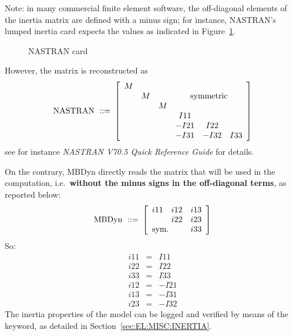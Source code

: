 Note: in many commercial finite element software, the off-diagonal elements 
of the inertia matrix are defined with a minus sign; for instance, 
NASTRAN's  lumped inertia card expects the values as indicated
in Figure~\ref{fig:el:body:CONM2}.
%
\begin{figure}[b]
\centering
\begin{minipage}{120mm}
\end{minipage}
\caption{NASTRAN  card}
\label{fig:el:body:CONM2}
\end{figure}
%
However, the matrix is reconstructed as
\begin{displaymath}
	\mathrm{NASTRAN \ ::= } \ \sqbr{\matr{cccccc}{
		M & & & & & \\
		& M & & \multicolumn{3}{c}{\mathrm{symmetric}} \\
		& & M & & & \\
		& & & I11 & & \\
		& & & -I21 & I22 & \\
		& & & -I31 & -I32 & I33
	}}
\end{displaymath}
see for instance \emph{NASTRAN V70.5 Quick Reference Guide} for details.

\noindent
On the contrary, MBDyn directly reads the matrix 
that will be used in the computation, i.e.\ 
\textbf{without the minus signs in the off-diagonal terms},
as reported below:
\begin{displaymath}
	\mathrm{MBDyn \ ::= } \ \sqbr{\matr{ccc}{
		i11 & i12 & i13 \\
		& i22 & i23 \\
		\multicolumn{2}{l}{\mathrm{sym.}} & i33
	}}
\end{displaymath}
So:
\begin{eqnarray*}
	i11 & = & I11 \\
	i22 & = & I22 \\
	i33 & = & I33 \\
	i12 & = & - I21 \\
	i13 & = & - I31 \\
	i23 & = & - I32
\end{eqnarray*}
The inertia properties of the model can be logged and verified
by means of the  keyword, as detailed
in Section~\ref{sec:EL:MISC:INERTIA}.

